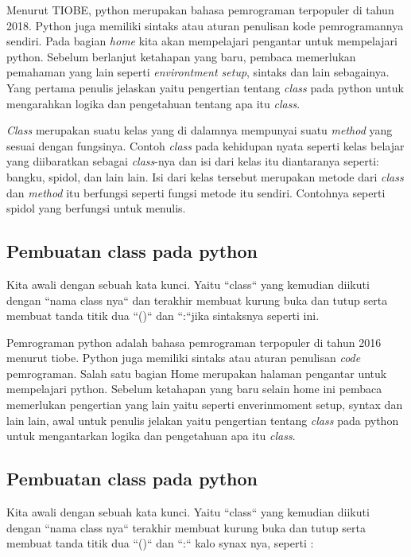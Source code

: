 Menurut TIOBE, python merupakan bahasa pemrograman terpopuler di tahun 2018. Python juga memiliki sintaks atau aturan penulisan kode pemrogramannya sendiri. Pada bagian \textit{home} kita akan mempelajari pengantar untuk mempelajari python. Sebelum berlanjut ketahapan yang baru, pembaca memerlukan pemahaman yang lain seperti \textit{environtment setup}, sintaks dan lain sebagainya. Yang pertama penulis jelaskan yaitu pengertian tentang \textit{class} pada python untuk mengarahkan logika dan pengetahuan tentang apa itu \textit{class}.

\textit{Class} merupakan suatu kelas yang di dalamnya mempunyai suatu \textit{method} yang sesuai dengan fungsinya. Contoh \textit{class} pada kehidupan nyata seperti kelas belajar yang diibaratkan sebagai \textit{class}-nya dan isi dari kelas itu diantaranya seperti: bangku, spidol, dan lain lain. Isi dari kelas tersebut merupakan metode dari \textit{class} dan \textit{method} itu berfungsi seperti fungsi metode itu sendiri. Contohnya seperti spidol yang berfungsi untuk menulis.
\subsection{Pembuatan class pada python}
Kita awali dengan sebuah kata kunci. Yaitu  ``class`` yang kemudian diikuti dengan ``nama class nya`` dan terakhir membuat kurung buka dan tutup serta membuat tanda titik dua  ``()`` dan ``:``jika sintaksnya seperti ini.


Pemrograman python adalah bahasa pemrograman terpopuler di tahun 2016 menurut tiobe. Python juga memiliki sintaks atau aturan penulisan \textit{code} pemrograman. Salah satu bagian Home merupakan halaman pengantar untuk mempelajari python. Sebelum ketahapan yang baru selain home ini pembaca memerlukan pengertian yang lain yaitu seperti enverinmoment setup, syntax dan lain lain, awal untuk penulis jelakan yaitu pengertian tentang \textit{class} pada python untuk mengantarkan logika dan pengetahuan apa itu \textit{class}.

\subsection{Pembuatan class pada python}
Kita awali dengan sebuah kata kunci. Yaitu ``class`` yang kemudian diikuti dengan ``nama class nya`` terakhir membuat kurung buka dan tutup serta membuat tanda titik dua  ``()`` dan ``:`` kalo synax nya, seperti :


